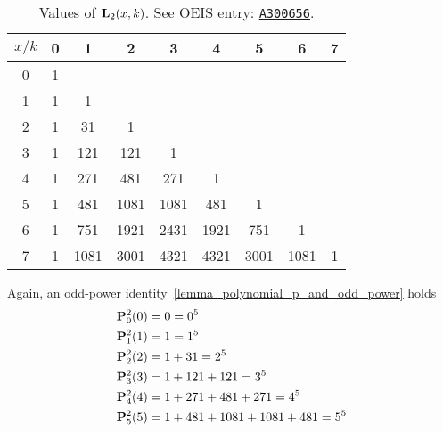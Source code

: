 \begin{table}[H]
    \begin{tabular}{c|cccccccc}
        $x/k$ & 0 & 1    & 2    & 3    & 4    & 5    & 6    & 7 \\ [3px]
        \hline
        0     & 1 &      &      &      &      &      &      &   \\
        1     & 1 & 1    &      &      &      &      &      &   \\
        2     & 1 & 31   & 1    &      &      &      &      &   \\
        3     & 1 & 121  & 121  & 1    &      &      &      &   \\
        4     & 1 & 271  & 481  & 271  & 1    &      &      &   \\
        5     & 1 & 481  & 1081 & 1081 & 481  & 1    &      &   \\
        6     & 1 & 751  & 1921 & 2431 & 1921 & 751  & 1    &   \\
        7     & 1 & 1081 & 3001 & 4321 & 4321 & 3001 & 1081 & 1
    \end{tabular}
    \caption{Values of ${\mathbf{L}}\sb{2}(x,k)$. See OEIS entry: \href{https://oeis.org/A300656}{\texttt{A300656}}.}
    \label{tab:tab_4}
\end{table}
Again, an odd-power identity~\ref{lemma_polynomial_p_and_odd_power} holds
\begin{equation*}
    \begin{split}
        {\mathbf{P}}\sp{2} \sb{0}(0) &= 0 = 0^5 \\
        {\mathbf{P}}\sp{2} \sb{1}(1) &= 1 = 1^5 \\
        {\mathbf{P}}\sp{2} \sb{2}(2) &= 1+31 = 2^5 \\
        {\mathbf{P}}\sp{2} \sb{3}(3) &= 1+121+121 = 3^5 \\
        {\mathbf{P}}\sp{2} \sb{4}(4) &= 1+271+481+271 = 4^5 \\
        {\mathbf{P}}\sp{2} \sb{5}(5) &= 1+481+1081+1081+481 = 5^5
    \end{split}
\end{equation*}
